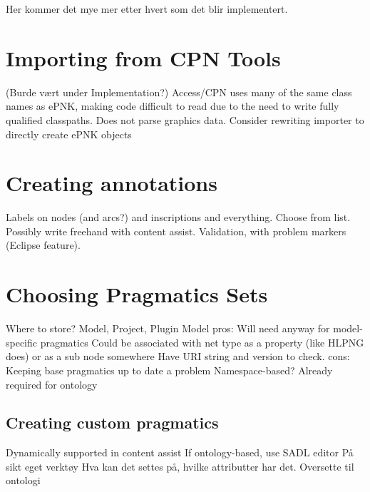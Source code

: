 Her kommer det mye mer etter hvert som det blir implementert.

\section{Importing from CPN Tools}
(Burde vært under Implementation?)
Access/CPN uses many of the same class names as ePNK, making code difficult to
read due to the need to write fully qualified classpaths.
Does not parse graphics data.
Consider rewriting importer to directly create ePNK objects

\section{Creating annotations}
Labels on nodes (and arcs?) and inscriptions and everything. 
Choose from list. Possibly write freehand with content assist. Validation, with
problem markers (Eclipse feature).

\section{Choosing Pragmatics Sets}
Where to store? Model, Project, Plugin
Model pros:
	Will need anyway for model-specific pragmatics
	Could be associated with net type as a property (like HLPNG does) or as a sub
	node somewhere
	Have URI string and version to check.
cons:
	Keeping base pragmatics up to date a problem
Namespace-based? Already required for ontology


	\subsection{Creating custom pragmatics}
	Dynamically supported in content assist 
	If ontology-based, use SADL editor
	På sikt eget verktøy
		Hva kan det settes på, hvilke attributter har det.
		Oversette til ontologi

